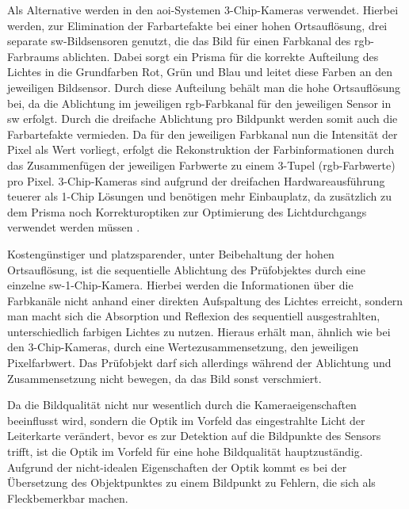         Als Alternative werden in den \ac{aoi}-Systemen 3-Chip-Kameras verwendet.
        Hierbei werden, zur Elimination der Farbartefakte bei einer hohen Ortsauflösung, drei separate \ac{sw}-Bildsensoren genutzt, die das Bild für einen Farbkanal des \ac{rgb}-Farbraums ablichten.
        Dabei sorgt ein Prisma für die korrekte Aufteilung des Lichtes in die Grundfarben Rot, Grün und Blau und leitet diese Farben an den jeweiligen Bildsensor.
        Durch diese Aufteilung behält man die hohe Ortsauflösung bei, da die Ablichtung im jeweiligen \ac{rgb}-Farbkanal für den jeweiligen Sensor in \acl{sw} erfolgt. 
        Durch die dreifache Ablichtung pro Bildpunkt werden somit auch die Farbartefakte vermieden. \cite{berger_test-_2012}
        Da für den jeweiligen Farbkanal nun die Intensität der Pixel als Wert vorliegt, erfolgt die Rekonstruktion der Farbinformationen durch das Zusammenfügen der jeweiligen Farbwerte zu einem 3-Tupel (\ac{rgb}-Farbwerte) pro Pixel.
        3-Chip-Kameras sind aufgrund der dreifachen Hardwareausführung teuerer als 1-Chip Lösungen und benötigen mehr Einbauplatz, da zusätzlich zu dem Prisma noch Korrekturoptiken zur Optimierung des Lichtdurchgangs verwendet werden müssen \cite{berger_test-_2012}.

        Kostengünstiger und platzsparender, unter Beibehaltung der hohen Ortsauflösung, ist die sequentielle Ablichtung des Prüfobjektes durch eine einzelne \acl{sw}-1-Chip-Kamera.
        Hierbei werden die Informationen über die Farbkanäle nicht anhand einer direkten Aufspaltung des Lichtes erreicht, sondern man macht sich die Absorption und Reflexion des sequentiell ausgestrahlten, unterschiedlich farbigen Lichtes zu nutzen.
        Hieraus erhält man, ähnlich wie bei den 3-Chip-Kameras, durch eine Wertezusammensetzung, den jeweiligen Pixelfarbwert. \cite{berger_test-_2012}
        Das Prüfobjekt darf sich allerdings während der Ablichtung und Zusammensetzung nicht bewegen, da das Bild sonst verschmiert.
        
        Da die Bildqualität nicht nur wesentlich durch die Kameraeigenschaften beeinflusst wird, sondern die Optik im Vorfeld das eingestrahlte Licht der Leiterkarte verändert, bevor es zur Detektion auf die Bildpunkte des Sensors trifft, ist die Optik im Vorfeld für eine hohe Bildqualität hauptzuständig.
        Aufgrund der nicht-idealen Eigenschaften der Optik kommt es bei der Übersetzung des Objektpunktes zu einem Bildpunkt zu Fehlern, die sich als \glqq Fleck\grqq\@ bemerkbar machen. \cite{berger_test-_2012}


